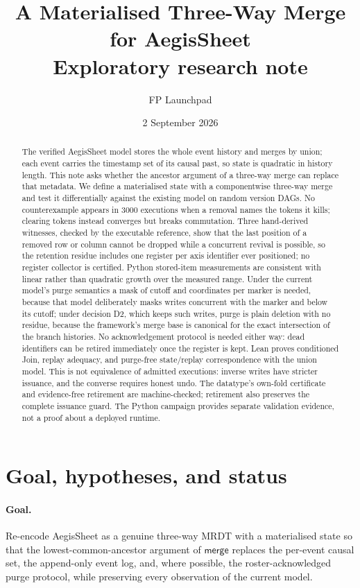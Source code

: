 \documentclass[11pt]{article}
\title{A Materialised Three-Way Merge for AegisSheet\\
  \large Exploratory research note}
\author{FP Launchpad}
\date{2 September 2026}
\newcommand{\merge}{\mathsf{merge}}
\begin{document}
\maketitle

\begin{abstract}
The verified AegisSheet model stores the whole event history and merges by
union; each event carries the timestamp set of its causal past, so state is
quadratic in history length. This note asks whether the ancestor argument of
a three-way merge can replace that metadata. We define a materialised state
with a componentwise three-way merge and test it differentially against the
existing model on random version DAGs. No counterexample appears in 3000
executions when a removal names the tokens it kills; clearing tokens instead
converges but breaks commutation. Three hand-derived witnesses, checked by
the executable reference, show that the last position of a removed row or
column cannot be dropped while a concurrent revival is possible, so the
retention residue includes one register per axis identifier ever positioned;
no register collector is certified. Python stored-item measurements are
consistent with linear rather than quadratic growth over the measured range.
Under the current model's purge semantics a mask of cutoff and
coordinates per marker is needed, because that model deliberately masks
writes concurrent with the marker and below its cutoff; under decision D2,
which keeps such writes, purge is plain deletion with no residue, because the
framework's merge base is canonical for the exact intersection of the branch
histories. No acknowledgement protocol is needed either way: dead identifiers
can be retired immediately once the register is kept. Lean proves conditioned
Join, replay adequacy, and purge-free state/replay correspondence with the
union model. This is not equivalence of admitted executions: inverse writes
have stricter issuance, and the converse requires honest undo. The datatype's
own-fold certificate and evidence-free retirement are machine-checked;
retirement also preserves the complete issuance guard. The Python campaign
provides separate validation evidence, not a proof about a deployed runtime.
\end{abstract}

\section{Goal, hypotheses, and status}

\paragraph{Goal.} Re-encode AegisSheet as a genuine three-way MRDT with a
materialised state so that the lowest-common-ancestor argument of $\merge$
replaces the per-event causal set, the append-only event log, and, where
possible, the roster-acknowledged purge protocol, while preserving every
observation of the current model.
\end{document}
